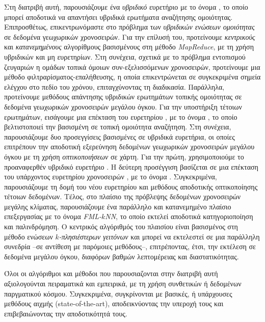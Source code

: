 Στη διατριβή αυτή, παρουσιάζουμε ένα \textit{υβριδικό} ευρετήριο με το όνομα \textit{\btsr}, το οποίο μπορεί αποδοτικά να απαντήσει υβριδικά ερωτήματα αναζήτησης ομοιότητας. Επιπροσθέτως, επικεντρωνόμαστε στο πρόβλημα των \textit{υβριδικών ενώσεων ομοιότητας} σε δεδομένα γεωχωρικών χρονοσειρών. Για την επίλυσή του, προτείνουμε \textit{κεντρικούς} και \textit{κατανεμημένους} αλγορίθμους βασισμένους στη μέθοδο \textit{MapReduce}, με τη χρήση υβριδικών και μη ευρετηρίων. Στη συνέχεια, σχετικά με το πρόβλημα εντοπισμού ζευγαριών η ομάδων τοπικά όμοιων συν-εξελισσόμενων χρονοσειρών, προτείνουμε μια μέθοδο φιλτραρίσματος-επαλήθευσης, η οποία επικεντρώνεται σε συγκεκριμένα σημεία ελέγχου στο πεδίο του χρόνου, επιταγχύνοντας τη διαδικασία. Παράλληλα, προτείνουμε μεθόδους απάντησης υβριδικών ερωτημάτων τοπικής ομοιότητας σε δεδομένα γεωχωρικών χρονοσειρών μεγάλου όγκου. Για την υποστήριξη τέτοιων ερωτημάτων, εισάγουμε μια επέκταση του ευρετηρίου \btsr, με το όνομα \textit{\sbtsr}, το οποίο βελτιστοποιεί την βασισμένη σε τοπική ομοιότητα αναζήτηση. Στη συνέχεια, παρουσιάζουμε δυο προσεγγίσεις βασισμένες σε υβριδικά ευρετήρια, οι οποίες επιτρέπουν την αποδοτική εξερεύνηση δεδομένων γεωχωρικών χρονοσειρών μεγάλου όγκου με τη χρήση \textit{οπτικοποιήσεων} σε χάρτη. Για την πρώτη, χρησιμοποιούμε το προαναφερθέν υβριδικό ευρετήριο \btsr. Η δεύτερη προσέγγιση βασίζεται σε μια επέκταση του υπάρχοντος ευρετηρίου χρονοσειρών \textit{\isax}, με το όνομα \textit{\hisax}. Συγκεκριμένα, παρουσιάζουμε τη δομή του νέου ευρετηρίου και μεθόδους αποδοτικής οπτικοποίησης τέτοιων δεδομένων. Τέλος, στο πλαίσιο της πρόβλεψης δεδομένων χρονοσειρών μεγάλης κλίματας, παρουσιάζουμε ένα παράλληλο και κατανεμημένο πλαίσιο επεξεργασίας με το όνομα \textit{FML-$k$NN}, το οποίο εκτελεί αποδοτικά κατηγοριοποίηση και παλινδρόμηση. Ο κεντρικός αλγόριθμός του πλαισίου είναι βασισμένος στη μέθοδο ενώσεων \textit{$k$-πλησιέστερων γειτόνων} και μπορεί να εκτελεστεί σε μια παράλληλη συνεδρία --σε αντίθεση με παρόμοιες μεθόδους--, επιτρέποντας, έτσι, την εκτέλεση σε δεδομένα μεγάλου όγκου, διαφόρων βαθμών λεπτομέρειας και διαστατικότητας.

Όλοι οι αλγόριθμοι και μέθοδοι που παρουσιαζονται στην διατριβή αυτή αξιολογούνται πειραματικά και εμπειρικά, με τη χρήση συνθετικών ή δεδομένων παργματικού κόσμου. Συγκεκριμένα, συγκρίνονται με βασικές, ή υπάρχουσες μεθόδους αιχμής (state-of-the-art), αποδεικνύοντας την υπεροχή τους και επιβεβαιώνοντας την αποδοτικότητά τους.